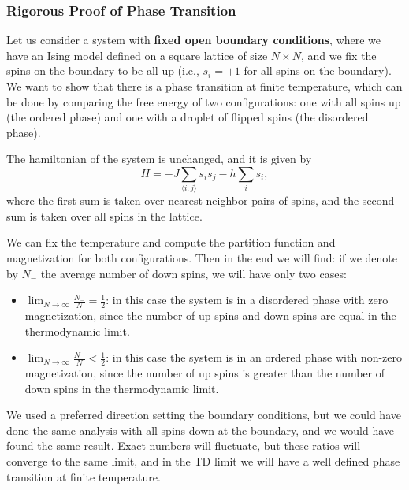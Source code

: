 \subsubsection{Rigorous Proof of Phase Transition}

Let us consider a system with \textbf{fixed open boundary conditions}, where we have an Ising model defined on a square lattice of size \(N \times N\), and we fix the spins on the boundary to be all up (i.e., \(s_i = +1\) for all spins on the boundary). We want to show that there is a phase transition at finite temperature, which can be done by comparing the free energy of two configurations: one with all spins up (the ordered phase) and one with a droplet of flipped spins (the disordered phase).

The hamiltonian of the system is unchanged, and it is given by
\[
    H = -J \sum_{\langle i,j \rangle} s_i s_j - h \sum_{i} s_i,
\]
where the first sum is taken over nearest neighbor pairs of spins, and the second sum is taken over all spins in the lattice.

We can fix the temperature and compute the partition function and magnetization for both configurations. Then in the end we will find: if we denote by \(N_-\) the average number of down spins, we will have only two cases:
\begin{itemize}
    \item \(\lim_{N \to \infty} \frac{N_-}{N} = \frac{1}{2}\): in this case the system is in a disordered phase with zero magnetization, since the number of up spins and down spins are equal in the thermodynamic limit.
    \item \(\lim_{N \to \infty} \frac{N_-}{N} < \frac{1}{2}\): in this case the system is in an ordered phase with non-zero magnetization, since the number of up spins is greater than the number of down spins in the thermodynamic limit.
\end{itemize}
We used a preferred direction setting the boundary conditions, but we could have done the same analysis with all spins down at the boundary, and we would have found the same result. Exact numbers will fluctuate, but these ratios will converge to the same limit, and in the TD limit we will have a well defined phase transition at finite temperature.